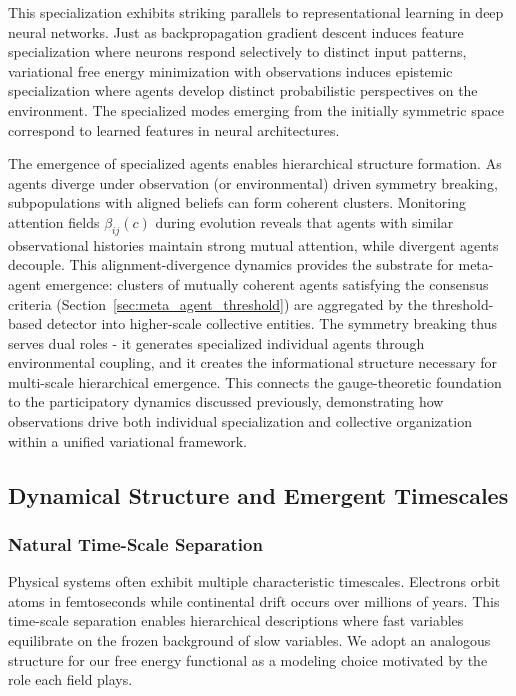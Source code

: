 \documentclass[11pt]{article}
\begin{document}
This specialization exhibits striking parallels to representational learning in deep neural networks. Just as backpropagation gradient descent induces feature specialization where neurons respond selectively to distinct input patterns, variational free energy minimization with observations induces epistemic specialization where agents develop distinct probabilistic perspectives on the environment. The specialized modes emerging from the initially symmetric space correspond to learned features in neural architectures.

The emergence of specialized agents enables hierarchical structure formation. As agents diverge under observation (or environmental) driven symmetry breaking, subpopulations with aligned beliefs can form coherent clusters. Monitoring attention fields $\beta_{ij}(c)$ during evolution reveals that agents with similar observational histories maintain strong mutual attention, while divergent agents decouple. This alignment-divergence dynamics provides the substrate for meta-agent emergence: clusters of mutually coherent agents satisfying the consensus criteria (Section~\ref{sec:meta_agent_threshold}) are aggregated by the threshold-based detector into higher-scale collective entities. The symmetry breaking thus serves dual roles - it generates specialized individual agents through environmental coupling, and it creates the informational structure necessary for multi-scale hierarchical emergence. This connects the gauge-theoretic foundation to the participatory dynamics discussed previously, demonstrating how observations drive both individual specialization and collective organization within a unified variational framework.

\subsection{Dynamical Structure and Emergent Timescales}

\subsubsection{Natural Time-Scale Separation}

Physical systems often exhibit multiple characteristic timescales. Electrons orbit atoms in femtoseconds while continental drift occurs over millions of years. This time-scale separation enables hierarchical descriptions where fast variables equilibrate on the frozen background of slow variables. We adopt an analogous structure for our free energy functional as a modeling choice motivated by the role each field plays.
\end{document}
